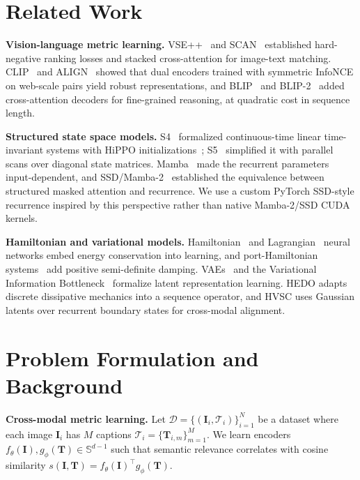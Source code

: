 \documentclass[runningheads,a4paper]{llncs}
\begin{document}
\section{Related Work}
\label{sec:related_work}

\textbf{Vision-language metric learning.} VSE++~\cite{faghri2017vse++} and SCAN~\cite{lee2018stacked} established hard-negative ranking losses and stacked cross-attention for image-text matching. CLIP~\cite{radford2021learning} and ALIGN~\cite{jia2021scaling} showed that dual encoders trained with symmetric InfoNCE on web-scale pairs yield robust representations, and BLIP~\cite{li2022blip} and BLIP-2~\cite{li2023blip2} added cross-attention decoders for fine-grained reasoning, at quadratic cost in sequence length.

\textbf{Structured state space models.} S4~\cite{gu2021efficiently} formalized continuous-time linear time-invariant systems with HiPPO initializations~\cite{gu2020hippo}; S5~\cite{smith2022simplified} simplified it with parallel scans over diagonal state matrices. Mamba~\cite{gu2023mamba} made the recurrent parameters input-dependent, and SSD/Mamba-2~\cite{dao2024transformers} established the equivalence between structured masked attention and recurrence. We use a custom PyTorch SSD-style recurrence inspired by this perspective rather than native Mamba-2/SSD CUDA kernels.

\textbf{Hamiltonian and variational models.} Hamiltonian~\cite{greydanus2019hamiltonian} and Lagrangian~\cite{cranmer2020lagrangian} neural networks embed energy conservation into learning, and port-Hamiltonian systems~\cite{massaroli2019port} add positive semi-definite damping. VAEs~\cite{kingma2013auto} and the Variational Information Bottleneck~\cite{alemi2016deep} formalize latent representation learning. HEDO adapts discrete dissipative mechanics into a sequence operator, and HVSC uses Gaussian latents over recurrent boundary states for cross-modal alignment.

\section{Problem Formulation and Background}
\label{sec:problem_formulation}

\textbf{Cross-modal metric learning.} Let $\mathcal{D} = \{(\mathbf{I}_i, \mathcal{T}_i)\}_{i=1}^N$ be a dataset where each image $\mathbf{I}_i$ has $M$ captions $\mathcal{T}_i = \{\mathbf{T}_{i,m}\}_{m=1}^M$. We learn encoders $f_{\theta}(\mathbf{I}), g_{\phi}(\mathbf{T}) \in \mathbb{S}^{d-1}$ such that semantic relevance correlates with cosine similarity $s(\mathbf{I}, \mathbf{T}) = f_{\theta}(\mathbf{I})^\top g_{\phi}(\mathbf{T})$.
\end{document}
